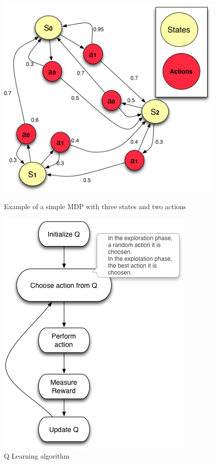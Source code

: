 \documentclass{bmcart}
\begin{document}
\begin{backmatter}
\begin{figure}
\begin{minipage}{.5\textwidth}
\centering
\includegraphics{./images/mdp1.png}
\caption{Example of a simple MDP with three states and two actions}
\label{fig:mdp}
\end{minipage}
\begin{minipage}{.5\textwidth}
\centering
\includegraphics{./images/qalgo.png}
\caption{Q Learning algorithm}
\label{fig:qalgo}
\end{minipage}
\end{figure}



\end{backmatter}
\end{document}
